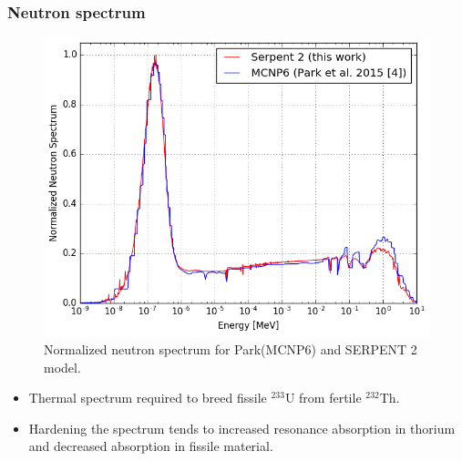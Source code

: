 \begin{frame}
  \frametitle{Neutron spectrum}
   \vspace{-0.1in}
  \begin{figure}[t]
   \includegraphics[height=0.7\textheight]{./images/spectrum.png}
   \vspace{-0.1in}
   \caption{Normalized neutron spectrum for Park(MCNP6) and SERPENT 2 model.}
    \end{figure}
    \vspace{-0.1in}

       \begin{itemize}
       \item Thermal spectrum required to breed fissile $^{233}$U from
         fertile $^{232}$Th.
       \item Hardening the spectrum tends to increased resonance absorption
         in thorium and decreased absorption in fissile material.
       \end{itemize}
\end{frame}

